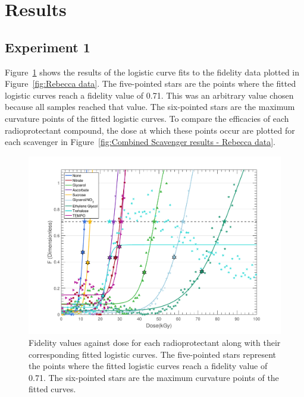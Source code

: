 \section{Results}
\label{sec:Results}

\subsection{Experiment 1}
\label{sub:Experiment 1 - Results}
Figure~\ref{fig:Main radioprotectant plot - Rebecca data} shows the results of the logistic curve fits to the fidelity data plotted in Figure~\ref{fig:Rebecca data}. The five-pointed stars are the points where the fitted logistic curves reach a fidelity value of 0.71. This was an arbitrary value chosen because all samples reached that value. The six-pointed stars are the maximum curvature points of the fitted logistic curves. To compare the efficacies of each radioprotectant compound, the dose at which these points occur are plotted for each scavenger in Figure~\ref{fig:Combined Scavenger results - Rebecca data}.

\begin{figure}
    \centering
    \includegraphics[width=1.0\textwidth]{figures/saxs/ScavengerPlot.pdf}
    \caption[Fidelity values as a function of dose for each radioprotectant]{Fidelity values against dose for each radioprotectant along with their corresponding fitted logistic curves. The five-pointed stars represent the points where the fitted logistic curves reach a fidelity value of 0.71. The six-pointed stars are the maximum curvature points of the fitted curves.}
    \label{fig:Main radioprotectant plot - Rebecca data}
\end{figure}

